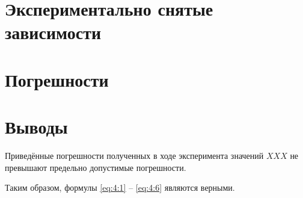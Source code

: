 \section{Экспериментально снятые зависимости}

\section{Погрешности}

\section{Выводы}

Приведённые погрешности полученных в ходе эксперимента значений $XXX$ не превышают предельно допустимые погрешности.

Таким образом, формулы \ref{eq:4:1} -- \ref{eq:4:6} являются верными.

